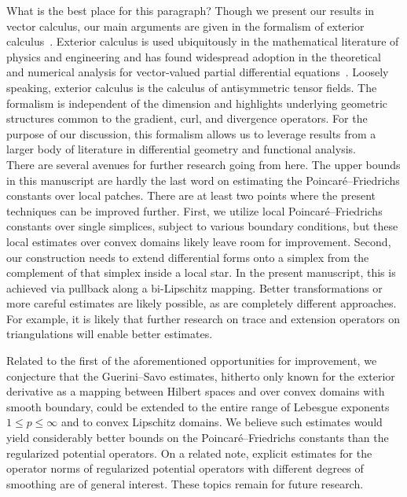 \documentclass[10pt,a4paper]{article}
\newcommand{\mwl}[1]{{\color{red}#1}}
\begin{document}
\mwl{What is the best place for this paragraph?}
Though we present our results in vector calculus, our main arguments are given in the formalism of exterior calculus~\cite{greub1967multilinear,lee2012smooth}. Exterior calculus is used ubiquitously in the mathematical literature of physics and engineering and has found widespread adoption in the theoretical and numerical analysis for vector-valued partial differential equations~\cite{hiptmair2002finite,gross2004electromagnetic,arnold2006finite,arnold2009geometric,arnold2010finite,demlow2014posteriori,licht2021local,arnold2021complexes}. Loosely speaking, exterior calculus is the calculus of antisymmetric tensor fields. The formalism is independent of the dimension and highlights underlying geometric structures common to the gradient, curl, and divergence operators.
For the purpose of our discussion, this formalism allows us to leverage results from a larger body of literature in differential geometry and functional analysis. 
\\ 




There are several avenues for further research going from here. 
The upper bounds in this manuscript are hardly the last word on estimating the Poincar\'e--Friedrichs constants over local patches. There are at least two points where the present techniques can be improved further. First, we utilize local Poincar\'e--Friedrichs constants over single simplices, subject to various boundary conditions, but these local estimates over convex domains likely leave room for improvement.
Second, our construction needs to extend differential forms onto a simplex from the complement of that simplex inside a local star. In the present manuscript, this is achieved via pullback along a bi-Lipschitz mapping. 
Better transformations or more careful estimates are likely possible, as are completely different approaches.  For example, it is likely that further research on trace and extension operators on triangulations will enable better estimates.

Related to the first of the aforementioned opportunities for improvement, we conjecture that the Guerini--Savo estimates, hitherto only known for the exterior derivative as a mapping between Hilbert spaces and over convex domains with smooth boundary, could be extended to the entire range of Lebesgue exponents $1 \leq p \leq \infty$ and to convex Lipschitz domains. We believe such estimates would yield considerably better bounds on the Poincar\'e--Friedrichs constants than the regularized potential operators. 
On a related note, explicit estimates for the operator norms of regularized potential operators with different degrees of smoothing are of general interest. 
These topics remain for future research. 
\end{document}
